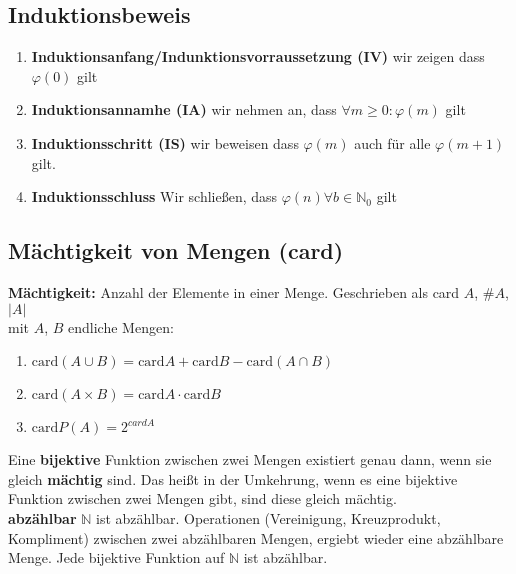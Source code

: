 
\subsection{Induktionsbeweis}

\begin{enumerate}
    \item \textbf{Induktionsanfang/Indunktionsvorraussetzung (IV)} wir zeigen dass $\varphi (0)$ gilt
    \item \textbf{Induktionsannamhe (IA)} wir nehmen an, dass $\forall m \geq 0 :\varphi (m)$ gilt
    \item \textbf{Induktionsschritt (IS)} wir beweisen dass $\varphi (m)$ auch für alle $\varphi (m+1)$ gilt.
    \item \textbf{Induktionsschluss} Wir schließen, dass $\varphi (n) \forall b\in \mathbb{N}_0$ gilt
\end{enumerate}

\subsection{Mächtigkeit von Mengen (card)}

\textbf{Mächtigkeit:} Anzahl der Elemente in einer Menge. Geschrieben als card $A$, $\# A$, $|A|$\\

mit $A$, $B$ endliche Mengen:
\begin{enumerate}
    \item $\text{card} (A\cup B) = \text{card} A + \text{card} B - \text{card} (A\cap B)$
    \item $\text{card} (A\times B) = \text{card} A \cdot \text{card} B$
    \item $\text{card} P(A) = 2^{card A}$
\end{enumerate}

Eine \textbf{bijektive} Funktion zwischen zwei Mengen existiert genau dann, wenn sie gleich \textbf{mächtig} sind. Das heißt in der Umkehrung, wenn es eine bijektive Funktion zwischen zwei Mengen gibt, sind diese gleich mächtig.\\

\textbf{abzählbar} $\mathbb{N}$ ist abzählbar. Operationen (Vereinigung, Kreuzprodukt, Kompliment) zwischen zwei abzählbaren Mengen, ergiebt wieder eine abzählbare Menge. Jede bijektive Funktion auf $\mathbb{N}$ ist abzählbar.\\

